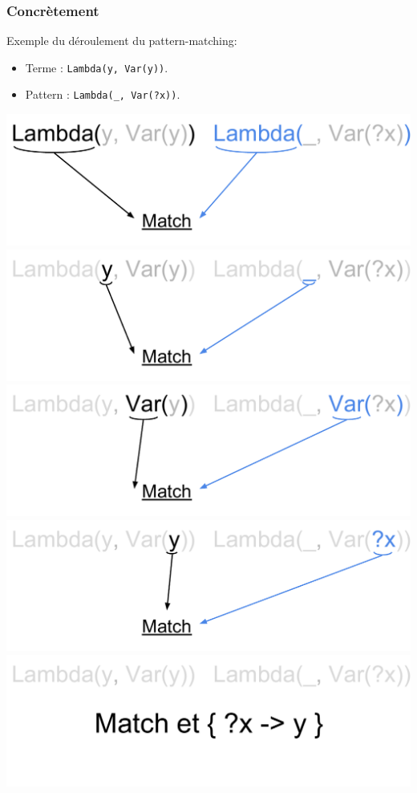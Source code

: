 \begin{frame}
\frametitle{Concrètement}

Exemple du déroulement du pattern-matching:
\begin{itemize}
  
  \item Terme : \texttt{Lambda(y, Var(y))}.

  \item Pattern : \texttt{Lambda(\_, Var(?x))}.

\end{itemize}

\bigskip

\begin{center}
      {\includegraphics[scale=0.5]{pattern/trivial1.pdf}}
      {\includegraphics[scale=0.5]{pattern/trivial2.pdf}}
      {\includegraphics[scale=0.5]{pattern/trivial3.pdf}}
      {\includegraphics[scale=0.5]{pattern/trivial4.pdf}}
      {\includegraphics[scale=0.5]{pattern/trivial5.pdf}}


\end{center}
\end{frame}
